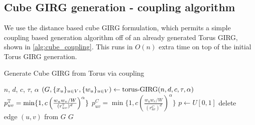 
\subsection{Cube GIRG generation - coupling algorithm}
We use the distance based cube GIRG formulation, which permits a simple coupling based generation algorithm off of an already generated Torus GIRG, shown in \cref{alg:cube_coupling}. This runs in $O(n)$ extra time on top of the initial Torus GIRG generation.

\begin{algorithm}
    \caption{Generate Cube GIRG from Torus via coupling}\label{alg:cube_coupling}
    \begin{algorithmic}
    \Require $n$, $d$, $c$, $\tau$, $\alpha$
    \State $\left ( G, \{x_u\}_{u \in V}, \{w_u\}_{u \in V} \right ) \gets \text{torus-}\mathrm{GIRG}(n,d,c,\tau, \alpha)$
        \State $p_{uv}^{\mathbb{T}} = \min \{1, c \left (
            \frac{w_u w_v / W}{(r_{uv}^{\mathbb{T}})^d} \right )^\alpha \}$
        \State $p_{uv}^C = \min \{1, c \left (
            \frac{w_u w_v / W}{(r_{uv}^C)^d} \right )^\alpha \}$
        \State $p \gets U[0,1]$
            \State delete edge $(u,v)$ from $G$
        \EndIf
    \EndFor
    \State \Return $G$
\end{algorithmic}
\end{algorithm}



